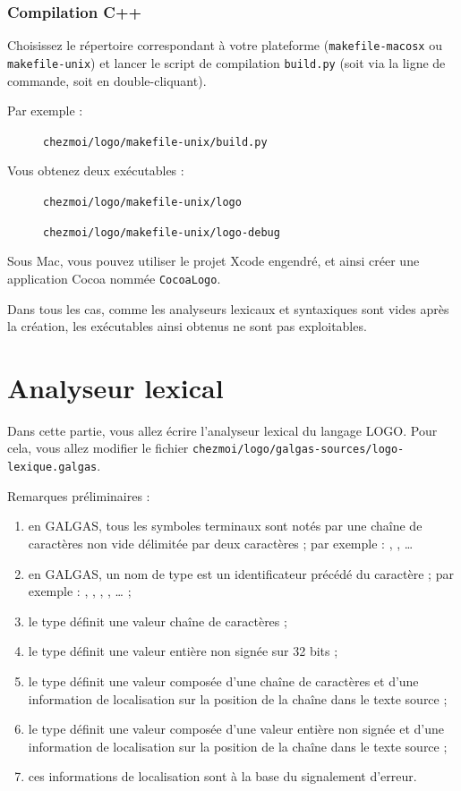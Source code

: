 \subsubsection{Compilation C++}
Choisissez le répertoire correspondant à votre plateforme (\texttt{makefile-macosx} ou \texttt{makefile-unix}) et lancer le script de compilation \texttt{build.py} (soit via la ligne de commande, soit en double-cliquant).

Par exemple :
\begin{description}
  \item[ ] \texttt{chezmoi/logo/makefile-unix/build.py}
\end{description}

Vous obtenez deux exécutables :
\begin{description}
  \item[ ] \texttt{chezmoi/logo/makefile-unix/logo}
  \item[ ] \texttt{chezmoi/logo/makefile-unix/logo-debug}
\end{description}

Sous Mac, vous pouvez utiliser le projet Xcode engendré, et ainsi créer une application Cocoa nommée \texttt{CocoaLogo}.

Dans tous les cas, comme les analyseurs lexicaux et syntaxiques sont vides après la création, les exécutables ainsi obtenus ne sont pas exploitables.


\section {Analyseur lexical}


Dans cette partie, vous allez écrire l’analyseur lexical du langage LOGO. Pour cela, vous allez modifier le fichier \texttt{chezmoi/logo/galgas-sources/logo-lexique.galgas}.

Remarques préliminaires :
\begin{enumerate}
  \item en GALGAS, tous les symboles terminaux sont notés par une chaîne de caractères non vide délimitée par deux caractères \galgas{$} ; par exemple : , , … 
  \item en GALGAS, un nom de type est un identificateur précédé du caractère  ; par exemple : , , , , … ;
  \item le type  définit une valeur chaîne de caractères ;
  \item le type  définit une valeur entière non signée sur 32 bits ;
  \item le type  définit une valeur composée d'une chaîne de caractères et d'une information de localisation sur la position de la chaîne dans le texte source ;
  \item le type  définit une valeur composée d'une valeur entière non signée et d'une information de localisation sur la position de la chaîne dans le texte source ;
  \item ces informations de localisation sont à la base du signalement d'erreur.
\end{enumerate}

